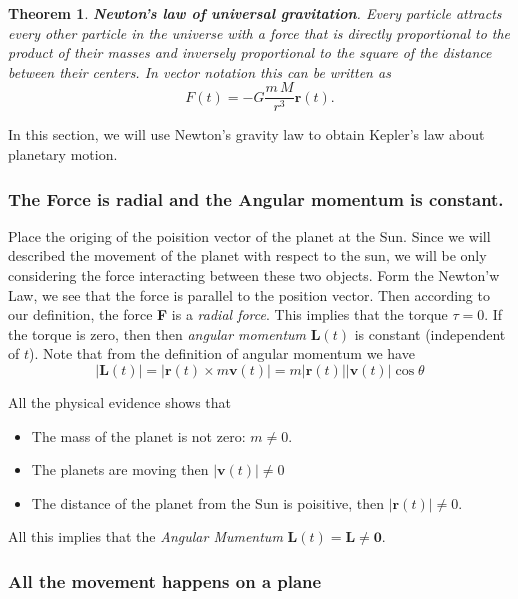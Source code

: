 \documentclass{amsart}
\newtheorem{thm}{Theorem}
\begin{document}
\begin{thm}
\textbf{Newton's law of universal gravitation}. Every particle attracts every other particle in the universe with a force that is directly proportional to the product of their masses and inversely proportional to the square of the distance between their centers. In vector notation this can be written as \[ F(t) = -G \frac{m \, M}{r^3} \mathbf{r}(t). \]
\end{thm}

In this section, we will use Newton's gravity law to obtain Kepler's law about planetary motion.


\subsubsection{The Force is radial and the Angular momentum is constant.}
\label{sec:org1eb6ab2}

Place the origing of the poisition vector of the planet at the Sun. Since we will described the movement of the planet with respect to the sun, we will be only considering 
the force interacting between these two objects. Form the Newton'w Law, we see that the force is parallel to the position vector. Then according to our definition, the force
\textbf{F} is a \emph{radial force}. This implies that the torque \(\tau = 0\). If the torque is zero, then then \emph{angular momentum} \(\mathbf{L}(t)\) is constant (independent of \(t\)).
Note that from the definition of angular momentum we have
\[ |\mathbf{L}(t)| = |\mathbf{r}(t) \times m \mathbf{v}(t)| = m |\mathbf{r}(t)||\mathbf{v}(t)| \cos\theta \]

All the physical evidence shows that
\begin{itemize}
\item The mass of the planet is not zero: \(m\neq 0\).
\item The planets are moving then \(|\mathbf{v}(t)| \neq 0\)
\item The distance of the planet from the Sun is poisitive, then \(|\mathbf{r}(t)| \neq 0\).
\end{itemize}

All this implies that the \emph{Angular Mumentum} \(\mathbf{L}(t) = \mathbf{L} \neq \mathbf{0}\).

\subsubsection{All the movement happens on a plane}
\label{sec:org092fb7b}
\end{document}
